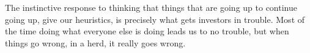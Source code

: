 \documentclass[12pt]{article}
\begin{document}
\begin{enumerate}

\begin{tcolorbox}[colback=white, sharp corners]
The instinctive response to thinking that things that are going up to continue going up, give our heuristics, is precisely what gets investors in trouble. Most of the time doing what everyone else is doing leads us to no trouble, but when things go wrong, in a herd, it really goes wrong. 
\end{tcolorbox}


\end{enumerate}

\newpage

\end{document}
